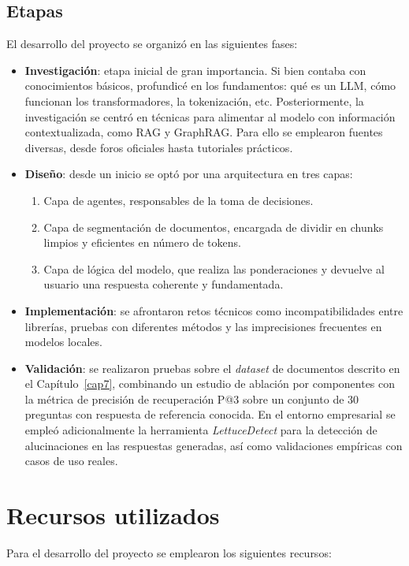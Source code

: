 \subsection{Etapas}
El desarrollo del proyecto se organizó en las siguientes fases:  
\begin{itemize}
    \item \textbf{Investigación}: etapa inicial de gran importancia. Si bien contaba con conocimientos básicos, profundicé en los fundamentos: qué es un LLM, cómo funcionan los transformadores, la tokenización, etc. Posteriormente, la investigación se centró en técnicas para alimentar al modelo con información contextualizada, como RAG y GraphRAG. Para ello se emplearon fuentes diversas, desde foros oficiales hasta tutoriales prácticos.  
    \item \textbf{Diseño}: desde un inicio se optó por una arquitectura en tres capas:  
        \begin{enumerate}
            \item Capa de agentes, responsables de la toma de decisiones.  
            \item Capa de segmentación de documentos, encargada de dividir en chunks limpios y eficientes en número de tokens.  
            \item Capa de lógica del modelo, que realiza las ponderaciones y devuelve al usuario una respuesta coherente y fundamentada.  
        \end{enumerate}
    \item \textbf{Implementación}: se afrontaron retos técnicos como incompatibilidades entre librerías, pruebas con diferentes métodos y las imprecisiones frecuentes en modelos locales.  
    \item \textbf{Validación}: se realizaron pruebas sobre el \textit{dataset} de documentos descrito en el Capítulo~\ref{cap7}, combinando un estudio de ablación por componentes con la métrica de precisión de recuperación P@3 sobre un conjunto de 30 preguntas con respuesta de referencia conocida. En el entorno empresarial se empleó adicionalmente la herramienta \textit{LettuceDetect} para la detección de alucinaciones en las respuestas generadas, así como validaciones empíricas con casos de uso reales.
\end{itemize}

\section{Recursos utilizados}
Para el desarrollo del proyecto se emplearon los siguientes recursos:  


